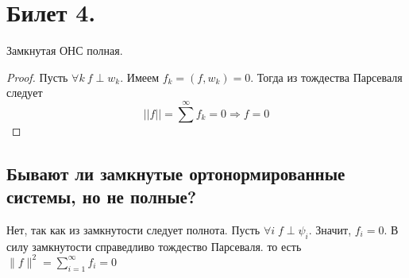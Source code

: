 \section{Билет 4.}

\begin{theorem}
    Замкнутая ОНС полная.
    \begin{proof}
        Пусть $\forall k \> f \perp w_k$. Имеем $f_k  = (f, w_k) = 0$. Тогда из тождества Парсеваля следует
        \[
            ||f|| = \sum^{\infty} f_k = 0 \Rightarrow f = 0
        \]
        \end{proof}
\end{theorem}

\subsection{Бывают ли замкнутые ортонормированные системы, но не полные?}
Нет, так как из замкнутости следует полнота. Пусть $\forall i \; f\perp \psi_i$. Значит, $f_i=0$. В силу замкнутости справедливо тождество Парсеваля. то есть $\|f\|^2=\sum_{i=1}^{\infty}f_i=0$